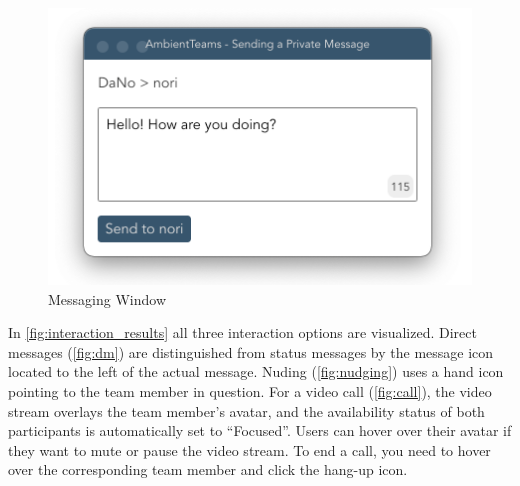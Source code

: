 \begin{figure}[h]
    \centering
    \includegraphics[width=.4\linewidth]{./images/messaging_window.png}
    \caption{Messaging Window}
    \label{fig:messaging_window}
\end{figure}

In \autoref{fig:interaction_results} all three interaction options are visualized. Direct messages (\autoref{fig:dm}) are distinguished from status messages by the message icon located to the left of the actual message. Nuding (\autoref{fig:nudging}) uses a hand icon pointing to the team member in question. For a video call (\autoref{fig:call}), the video stream overlays the team member's avatar, and the availability status of both participants is automatically set to \enquote{Focused}. Users can hover over their avatar if they want to mute or pause the video stream. To end a call, you need to hover over the corresponding team member and click the hang-up icon.


